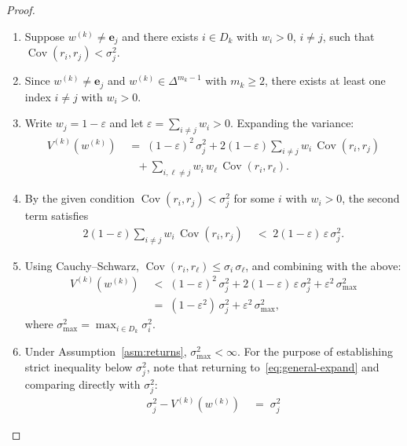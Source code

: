 \documentclass[12pt,openany]{book}
\newcommand{\bfw}{\mathbf{w}}
\newcommand{\bfe}{\mathbf{e}}
\newcommand{\calD}{\mathcal{D}}
\DeclareMathOperator{\Cov}{Cov}
\numberwithin{equation}{chapter}
\theoremstyle{plain}
\theoremstyle{definition}
\theoremstyle{remark}
\def\calD{D}%
\def\mathcal#1{#1}%
\def\bfw{w}%
\begin{document}
\begin{proof}
\begin{enumerate}
  \item Suppose $\bfw^{(k)} \neq \bfe_j$ and there exists
        $i \in \calD_k$ with $w_i > 0$, $i \neq j$, such that
        $\Cov(r_i, r_j) < \sigma_j^2$.
  \item Since $\bfw^{(k)} \neq \bfe_j$ and $\bfw^{(k)} \in
        \Delta^{m_k-1}$ with $m_k \geq 2$, there exists at least
        one index $i \neq j$ with $w_i > 0$.
  \item Write $w_j = 1 - \varepsilon$ and let $\varepsilon =
        \sum_{i \neq j} w_i > 0$.  Expanding the variance:
        \begin{align}
          V^{(k)}(\bfw^{(k)})
          &\;=\; (1-\varepsilon)^2\,\sigma_j^2
                 + 2(1-\varepsilon)\sum_{i \neq j} w_i\,\Cov(r_i,r_j)
                 \nonumber\\
          &\quad + \sum_{i,\ell \neq j} w_i\,w_\ell\,\Cov(r_i,r_\ell).
          \label{eq:general-expand}
        \end{align}
  \item By the given condition $\Cov(r_i, r_j) < \sigma_j^2$ for
        some $i$ with $w_i > 0$, the second term satisfies
        \begin{align}
          2(1-\varepsilon)\sum_{i \neq j} w_i\,\Cov(r_i,r_j)
          &\;<\; 2(1-\varepsilon)\,\varepsilon\,\sigma_j^2.
        \end{align}
  \item Using Cauchy--Schwarz, $\Cov(r_i, r_\ell) \leq
        \sigma_i\,\sigma_\ell$, and combining with the above:
        \begin{align}
          V^{(k)}(\bfw^{(k)})
          &\;<\; (1-\varepsilon)^2\,\sigma_j^2
                 + 2(1-\varepsilon)\,\varepsilon\,\sigma_j^2
                 + \varepsilon^2\,\sigma_{\max}^2
                 \nonumber\\
          &\;=\; (1 - \varepsilon^2)\,\sigma_j^2
                 + \varepsilon^2\,\sigma_{\max}^2,
        \end{align}
        where $\sigma_{\max}^2 = \max_{i \in \calD_k}\sigma_i^2$.
  \item Under Assumption~\ref{asm:returns},
        $\sigma_{\max}^2 < \infty$.  For the purpose of
        establishing strict inequality below $\sigma_j^2$, note
        that returning to~\eqref{eq:general-expand} and comparing
        directly with $\sigma_j^2$:
        \begin{align}
          \sigma_j^2 - V^{(k)}(\bfw^{(k)})
          &\;=\; \sigma_j^2

\end{align}
\end{enumerate}
\end{proof}
\end{document}

